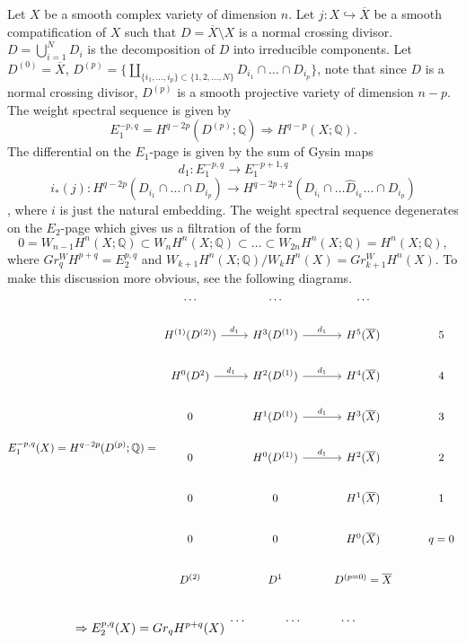 \documentclass[../main.tex]{subfiles}
\begin{document}
\begin{remark}
Let $X$ be a smooth complex variety of dimension $n$. Let $j:X\hookrightarrow \overline{X}$ be a smooth compatification of $X$ such that $D=\overline{X}\setminus X$ is a normal crossing divisor. $D=\bigcup_{i=1}^{N}D_{i}$ is the decomposition of $D$ into irreducible components. Let $D^{(0)}=\overline{X}$, $D^{(p)}=\{\amalg_{\{i_{1}, \dots, i_{p}\}\subset\{1,2,\dots, N\}}D_{i_{1}}\cap \dots \cap D_{i_{p}}\}$, note that since $D$ is a normal crossing divisor, $D^{(p)}$ is a smooth projective variety of dimension $n-p$. The weight spectral sequence is given by 
$$E_{1}^{-p,q}=H^{q-2p}(D^{(p)};\mathbb{Q})\Rightarrow H^{q-p}(X;\mathbb{Q}).$$
The differential on the $E_{1}$-page is given by the sum of Gysin maps
$$d_{1}:E_{1}^{-p,q}\rightarrow E_{1}^{-p+1,q}$$
$$i_{*}(j): H^{q-2p}(D_{i_{1}}\cap \dots \cap D_{i_{p}})\rightarrow H^{q-2p+2}(D_{i_{i}}\cap \dots \hat{D}_{i}_{k}\dots \cap D_{i_{p}})$$, where $i$ is just the natural embedding. The weight spectral sequence degenerates on the $E_{2}$-page which gives us a filtration of the form 
$$0=W_{n-1}H^{n}(X; \mathbb{Q})\subset W_{n}H^{n}(X; \mathbb{Q})\subset \dots \subset W_{2n}H^{n}(X; \mathbb{Q})=H^{n}(X; \mathbb{Q}),$$
where $Gr_{q}^{W}H^{p+q}=E_{2}^{p,q}$ and $W_{k+1}H^{n}(X;\mathbb{Q})/W_{k}H^{n}(X)=Gr_{k+1}^{W}H^{n}(X)$. To make this discussion more obvious, see the following diagrams.
$$E_{1}^{-p,q}(X)=H^{q-2p}(D^{(p)}; \mathbb{Q})=
\begin{tikzcd}
\dots & \dots & \dots &  \\
H^{(1)}(D^{(2)}) \arrow{r}{d_{1}}& H^{3}(D^{(1)})\arrow{r}{d_{1}} & H^{5}(\overline{X}) & 5\\
H^{0}(D^{2})\arrow{r}{d_{1}} & H^{2}(D^{(1)}) \arrow{r}{d_{1}}& H^{4}(\overline{X}) & 4\\
0 & H^{1}(D^{(1)})\arrow{r}{d_{1}} & H^{3}(\overline{X}) & 3\\
0 & H^{0}(D^{(1)}) \arrow{r}{d_{1}}& H^{2}(\overline{X})& 2\\
0 & 0 & H^{1}(\overline{X}) & 1\\
0 & 0 & H^{0}(\overline{X}) & q=0\\
D^{(2)} & D^{1} & D^{(p=0)}=\overline{X} & \\
\end{tikzcd}
$$
$$
\Rightarrow E_{2}^{p,q}(X)=Gr_{q}H^{p+q}(X)
\begin{tikzcd}
\dots & \dots & \dots &  \\

\end{tikzcd}$$
\end{remark}
\end{document}
